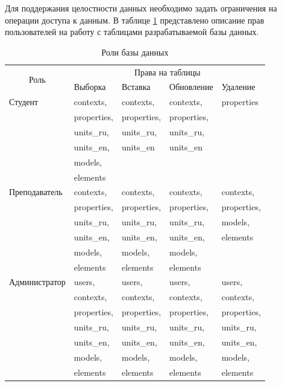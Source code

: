 Для поддержания целостности данных необходимо задать ограничения на операции доступа к данным. В таблице \ref{tbl:roles} представлено описание прав пользователей на работу с таблицами разрабатываемой базы данных.

\begin{table}[h]
	\begin{center}
		\captionsetup{justification=RaggedRight, singlelinecheck=off}
		\caption{Роли базы данных}
		\label{tbl:roles}
		\begin{tabular}{|l|l|l|l|l|}
			\hline
			\multicolumn{1}{|c|}{\multirow{2}[4]{*}{Роль}} & \multicolumn{4}{c|}{Права на таблицы} \bigstrut\\
			\cline{2-5} \multicolumn{1}{|c|}{} & Выборка & Вставка & Обновление & Удаление \bigstrut\\
			\hline
			Студент & contexts, & contexts, & contexts, & properties \\
			 		& properties, & properties, & properties, &  \\
			 		& units\_ru, & units\_ru, & units\_ru, &  \\
			 		& units\_en, & units\_en & units\_en &  \\
			 		& models, &  &  &  \\
			 		& elements &  &  &  \\
			\hline
			Преподаватель & contexts, & contexts, & contexts, & contexts, \\
					& properties, & properties, & properties, & properties, \\
					& units\_ru, & units\_ru, & units\_ru, & models, \\
					& units\_en, & units\_en, & units\_en, & elements \\
					& models, & models, & models, &  \\
					& elements & elements & elements &  \\
			\hline
			Администратор & users, & users, & users, & users, \\
					& contexts, & contexts, & contexts, & contexts, \\
					& properties, & properties, & properties, & properties, \\
					& units\_ru, & units\_ru, & units\_ru, & units\_ru, \\
					& units\_en, & units\_en, & units\_en, & units\_en, \\
					& models, & models, & models, & models, \\
					& elements & elements & elements & elements \\
			\hline
		\end{tabular}
	\end{center}
\end{table}

